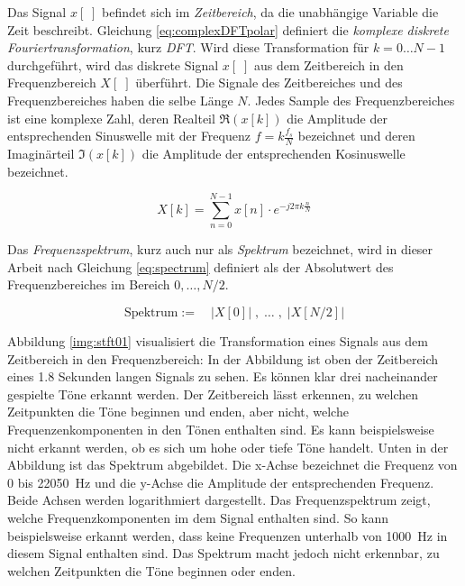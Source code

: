 Das Signal $x[\;]$ befindet sich im \emph{Zeitbereich}, da die unabhängige Variable die Zeit beschreibt. Gleichung \ref{eq:complexDFTpolar} definiert die \emph{komplexe diskrete Fouriertransformation}, kurz \emph{DFT}. Wird diese Transformation für $k=0 \ldots N-1$ durchgeführt, wird das diskrete Signal $x[\;]$ aus dem Zeitbereich in den Frequenzbereich $X[\;]$ überführt. Die Signale des Zeitbereiches und des Frequenzbereiches haben die selbe Länge $N$. Jedes Sample des Frequenzbereiches ist eine komplexe Zahl, deren Realteil $\Re(x[k])$ die Amplitude der entsprechenden Sinuswelle mit der Frequenz $f = k\frac{f_s}{N}$ bezeichnet und deren Imaginärteil  $\Im(x[k])$ die Amplitude der entsprechenden Kosinuswelle bezeichnet.\cite[S. 149, S. 567 - 571]{dspGuide} \cite[S. 60]{sprachverarbeitung}

\begin{equation}
\label{eq:complexDFTpolar}
X[k] =  \sum_{n = 0}^{N-1}  x[n] \cdot e^{-j 2\pi k \frac{n}{N}}
\end{equation}

Das \emph{Frequenzspektrum}, kurz auch nur als \emph{Spektrum} bezeichnet, wird in dieser Arbeit nach Gleichung \ref{eq:spectrum} definiert als der Absolutwert des Frequenzbereiches im Bereich $0, \ldots , N/2$.

\begin{equation}
\label{eq:spectrum}
\text{Spektrum} := \quad |X[0]| \; , \; \ldots \; , \; |X[N/2]|
\end{equation}

Abbildung \ref{img:stft01} visualisiert die Transformation eines Signals aus dem Zeitbereich in den Frequenzbereich: In der Abbildung ist oben der Zeitbereich eines 1.8 Sekunden langen Signals zu sehen. Es können klar drei nacheinander gespielte Töne erkannt werden. Der Zeitbereich lässt erkennen, zu welchen Zeitpunkten die Töne beginnen und enden, aber nicht, welche Frequenzenkomponenten in den Tönen enthalten sind. Es kann beispielsweise nicht erkannt werden, ob es sich um hohe oder tiefe Töne handelt. Unten in der Abbildung ist das Spektrum abgebildet. Die x-Achse bezeichnet die Frequenz von 0 bis \SI{22050}{\hertz} und die y-Achse die Amplitude der entsprechenden Frequenz. Beide Achsen werden logarithmiert dargestellt. Das Frequenzspektrum zeigt, welche Frequenzkomponenten im dem Signal enthalten sind. So kann beispielsweise erkannt werden, dass keine Frequenzen unterhalb von \SI{1000}{\hertz} in diesem Signal enthalten sind. Das Spektrum macht jedoch nicht erkennbar, zu welchen Zeitpunkten die Töne beginnen oder enden. 

